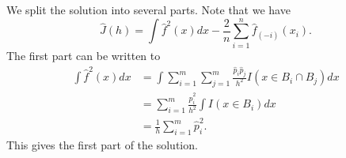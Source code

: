 We split the solution into several parts.
Note that we have
\begin{equation*}
    \hat{J}(h) = \int \hat{f}^2(x) dx - \frac{2}{n} \sum_{i = 1}^n \hat{f}_{(-i)}(x_i).
\end{equation*}
The first part can be written to
\begin{equation*}
    \begin{split}
        \int \hat{f}^2(x) dx
            &= \int \sum_{i = 1}^m \sum_{j = 1}^m \frac{\hat{p}_i \hat{p}_j}{h^2} I(x \in B_i \cap B_j) dx \\
            &= \sum_{i = 1}^m \frac{\hat{p}_i^2}{h^2} \int I(x \in B_i) dx \\
            &= \frac{1}{h} \sum_{i = 1}^m \hat{p}_i^2.
    \end{split}
\end{equation*}
This gives the first part of the solution.
